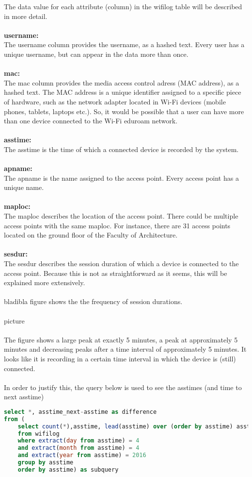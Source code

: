 The data value for each attribute (column) in the wifilog table will be described in more detail. 
\\\\
\textbf{username:}\\
The username column provides the username, as a hashed text. Every user has a unique username, but can appear in the data more than once.
\\\\
\textbf{mac:}\\
The mac column provides the media access control adress (MAC address), as a hashed text. The MAC address is a unique identifier assigned to a specific piece of hardware, such as the network adapter located in Wi-Fi devices (mobile phones, tablets, laptops etc.). So, it would be possible that a user can have more than one device connected to the Wi-Fi eduroam network.
\\\\
\textbf{asstime:}\\
The asstime is the time of which a connected device is recorded by the system.
\\\\
\textbf{apname:}\\
The apname is the name assigned to the access point. Every access point has a unique name. 
\\\\
\textbf{maploc:}\\
The maploc describes the location of the access point. There could be multiple access points with the same maploc. For instance, there are 31 access points located on the ground floor of the Faculty of Architecture.
\\\\
\textbf{sesdur:}\\
The sesdur describes the session duration of which a device is connected to the access point. Because this is not as straightforward as it seems, this will be explained more extensively.
\\\\
bladibla figure shows the the frequency of session durations.
\\\\
picture
\\\\
The figure shows a large peak at exactly 5 minutes, a peak at approximately 5 minutes and decreasing peaks after a time interval of approximately 5 minutes. It looks like it is recording in a certain time interval in which the device is (still) connected. \\\\
In order to justify this, the query below is used to see the asstimes (and time to next asstime)
\begin{lstlisting}[language=SQL]
select *, asstime_next-asstime as difference
from (
	select count(*),asstime, lead(asstime) over (order by asstime) asstime_next
	from wifilog
	where extract(day from asstime) = 4
	and extract(month from asstime) = 4
	and extract(year from asstime) = 2016
	group by asstime
	order by asstime) as subquery
\end{lstlisting}


